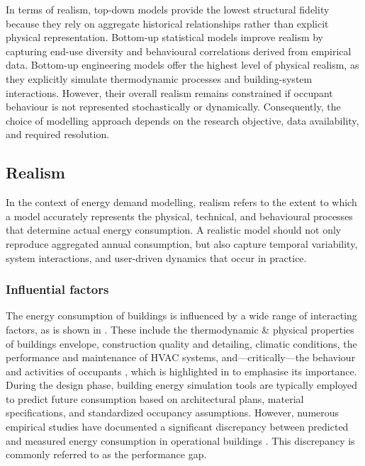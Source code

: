 In terms of realism, top-down models provide the lowest structural fidelity because they rely on aggregate historical relationships rather than explicit physical representation. Bottom-up statistical models improve realism by capturing end-use diversity and behavioural correlations derived from empirical data. Bottom-up engineering models offer the highest level of physical realism, as they explicitly simulate thermodynamic processes and building-system interactions. However, their overall realism remains constrained if occupant behaviour is not represented stochastically or dynamically.
\newline Consequently, the choice of modelling approach depends on the research objective, data availability, and required resolution.


\subsection{Realism}\label{sec:realism}
In the context of energy demand modelling, realism refers to the extent to which a model accurately represents the physical, technical, and behavioural processes that determine actual energy consumption. A realistic model should not only reproduce aggregated annual consumption, but also capture temporal variability, system interactions, and user-driven dynamics that occur in practice.

\subsubsection*{Influential factors}
The energy consumption of buildings is influenced by a wide range of interacting factors, as is shown in . These include the thermodynamic \& physical properties of buildings envelope, construction quality and detailing, climatic conditions, the performance and maintenance of HVAC systems, and—critically—the behaviour and activities of occupants \cite{delzendehImpactOccupantsBehaviours2017}, which is highlighted in  to emphasise its importance. 
\newline During the design phase, building energy simulation tools are typically employed to predict future consumption based on architectural plans, material specifications, and standardized occupancy assumptions. However, numerous empirical studies have documented a significant discrepancy between predicted and measured energy consumption in operational buildings \cite{delzendehImpactOccupantsBehaviours2017}. This discrepancy is commonly referred to as the performance gap.

